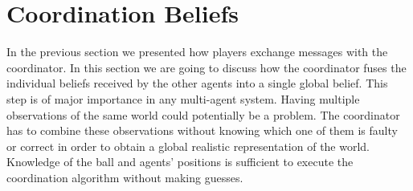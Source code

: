\section{Coordination Beliefs}

In the previous section we presented how players exchange messages with the coordinator. In this section we are going to discuss how the coordinator fuses the individual beliefs received by the other agents into a single global belief. This step is of major importance in any multi-agent system. Having multiple observations of the same world could potentially be a problem. The coordinator has to combine these observations without knowing which one of them is faulty or correct in order to obtain a global realistic representation of the world. Knowledge of the ball and agents' positions is sufficient to execute the coordination algorithm without making guesses.

